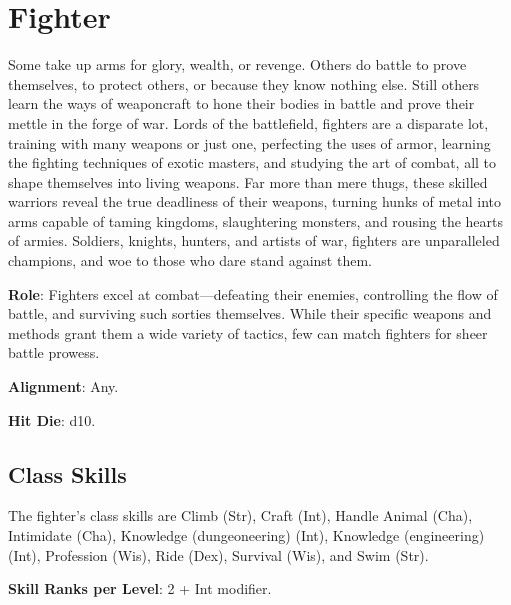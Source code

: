 \section{Fighter}

\label{f0}				
Some take up arms for glory, wealth, or revenge. Others do battle to prove themselves, to protect others, or because they know nothing else. Still others learn the ways of weaponcraft to hone their bodies in battle and prove their mettle in the forge of war. Lords of the battlefield, fighters are a disparate lot, training with many weapons or just one, perfecting the uses of armor, learning the fighting techniques of exotic masters, and studying the art of combat, all to shape themselves into living weapons. Far more than mere thugs, these skilled warriors reveal the true deadliness of their weapons, turning hunks of metal into arms capable of taming kingdoms, slaughtering monsters, and rousing the hearts of armies. Soldiers, knights, hunters, and artists of war, fighters are unparalleled champions, and woe to those who dare stand against them.
				
\textbf{Role}: Fighters excel at combat---defeating their enemies, controlling the flow of battle, and surviving such sorties themselves. While their specific weapons and methods grant them a wide variety of tactics, few can match fighters for sheer battle prowess.
				
\textbf{Alignment}: Any.
				
\textbf{Hit Die}: d10.
				
\subsection{Class Skills}

				
The fighter's class skills are Climb (Str), Craft (Int), Handle Animal (Cha), Intimidate (Cha), Knowledge (dungeoneering) (Int), Knowledge (engineering) (Int), Profession (Wis), Ride (Dex), Survival (Wis), and Swim (Str). 
				
\textbf{Skill Ranks per Level}: 2 + Int modifier.

